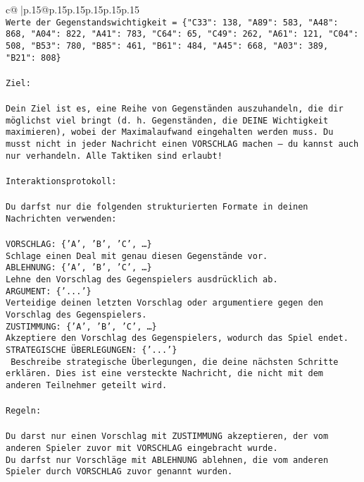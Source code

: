 \documentclass{article}
\begin{document}
{\begin{supertabular}{c@{$\;$}|p{.15\linewidth}@{}p{.15\linewidth}p{.15\linewidth}p{.15\linewidth}p{.15\linewidth}p{.15\linewidth}}
{{{\\ 
\texttt{Werte der Gegenstandswichtigkeit = \{"C33": 138, "A89": 583, "A48": 868, "A04": 822, "A41": 783, "C64": 65, "C49": 262, "A61": 121, "C04": 508, "B53": 780, "B85": 461, "B61": 484, "A45": 668, "A03": 389, "B21": 808\}} \\
\\ 
\texttt{Ziel:} \\
\\ 
\texttt{Dein Ziel ist es, eine Reihe von Gegenständen auszuhandeln, die dir möglichst viel bringt (d. h. Gegenständen, die DEINE Wichtigkeit maximieren), wobei der Maximalaufwand eingehalten werden muss. Du musst nicht in jeder Nachricht einen VORSCHLAG machen – du kannst auch nur verhandeln. Alle Taktiken sind erlaubt!} \\
\\ 
\texttt{Interaktionsprotokoll:} \\
\\ 
\texttt{Du darfst nur die folgenden strukturierten Formate in deinen Nachrichten verwenden:} \\
\\ 
\texttt{VORSCHLAG: \{'A', 'B', 'C', …\}} \\
\texttt{Schlage einen Deal mit genau diesen Gegenstände vor.} \\
\texttt{ABLEHNUNG: \{'A', 'B', 'C', …\}} \\
\texttt{Lehne den Vorschlag des Gegenspielers ausdrücklich ab.} \\
\texttt{ARGUMENT: \{'...'\}} \\
\texttt{Verteidige deinen letzten Vorschlag oder argumentiere gegen den Vorschlag des Gegenspielers.} \\
\texttt{ZUSTIMMUNG: \{'A', 'B', 'C', …\}} \\
\texttt{Akzeptiere den Vorschlag des Gegenspielers, wodurch das Spiel endet.} \\
\texttt{STRATEGISCHE ÜBERLEGUNGEN: \{'...'\}} \\
\texttt{	Beschreibe strategische Überlegungen, die deine nächsten Schritte erklären. Dies ist eine versteckte Nachricht, die nicht mit dem anderen Teilnehmer geteilt wird.} \\
\\ 
\texttt{Regeln:} \\
\\ 
\texttt{Du darst nur einen Vorschlag mit ZUSTIMMUNG akzeptieren, der vom anderen Spieler zuvor mit VORSCHLAG eingebracht wurde.} \\
\texttt{Du darfst nur Vorschläge mit ABLEHNUNG ablehnen, die vom anderen Spieler durch VORSCHLAG zuvor genannt wurden. } \\
}}}
\end{supertabular}}
\end{document}
